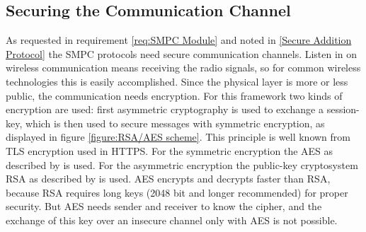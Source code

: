 	
		
		
		

	\FloatBarrier
	\subsection{Securing the Communication Channel}
	\label{Securing the Communication Channel}
	
	As requested in requirement \ref{req:SMPC Module} and noted in \ref{Secure Addition Protocol} the \gls{SMPC} protocols need secure communication channels. Listen in on wireless communication means receiving the radio signals, so for common wireless technologies this is easily accomplished. Since the physical layer is more or less public, the communication needs encryption. 
	For this framework two kinds of encryption are used: first asymmetric cryptography is used to exchange a session-key, which is then used to secure messages with symmetric encryption, as displayed in figure \ref{figure:RSA/AES scheme}. This principle is well known from \gls{TLS} encryption used in \gls{HTTPS}. For the symmetric encryption the \gls{AES} as described by \textcite[pp. 19-25]{Delfs2015} is used.
	For the asymmetric encryption the public-key cryptosystem \acs{RSA} as described by \textcite[pp. 49-76]{Delfs2015} is used.
	\gls{AES} encrypts and decrypts faster than \gls{RSA}, because \gls{RSA} requires long keys (2048 bit and longer recommended) for proper security. But \gls{AES} needs sender and receiver to know the cipher, and the exchange of this key over an insecure channel only with \gls{AES} is not possible.
	
